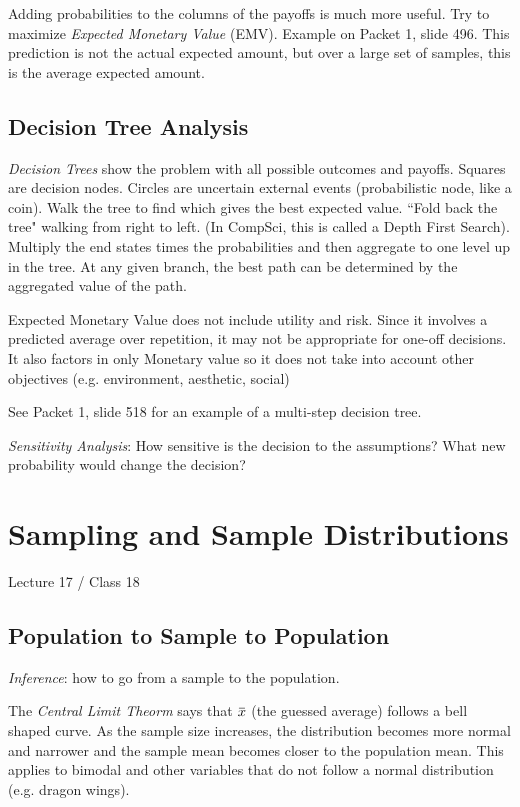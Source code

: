 \documentclass[11pt, oneside]{article}   	%
\newcommand{\overbar}[1]{\mkern 1.5mu\overline{\mkern-1.5mu#1\mkern-1.5mu}\mkern 1.5mu}
\begin{document}
Adding probabilities to the columns of the payoffs is much more useful. Try to maximize \textit{Expected Monetary Value} (EMV). Example on Packet 1, slide 496. This prediction is not the actual expected amount, but over a large set of samples, this is the average expected amount. 

\subsection{Decision Tree Analysis}

\textit{Decision Trees} show the problem with all possible outcomes and payoffs. Squares are decision nodes. Circles are uncertain external events (probabilistic node, like a coin). Walk the tree to find which gives the best expected value. ``Fold back the tree" walking from right to left. (In CompSci, this is called a Depth First Search). Multiply the end states times the probabilities and then aggregate to one level up in the tree. At any given branch, the best path can be determined by the aggregated value of the path.

Expected Monetary Value does not include utility and risk. Since it involves a predicted average over repetition, it may not be appropriate for one-off decisions. It also factors in only Monetary value so it does not take into account other objectives (e.g. environment, aesthetic, social)

See Packet 1, slide 518 for an example of a multi-step decision tree.

\textit{Sensitivity Analysis}: How sensitive is the decision to the assumptions? What new probability would change the decision?


\section{Sampling and Sample Distributions}
Lecture 17 / Class 18

\subsection{Population to Sample to Population}

\textit{Inference}: how to go from a sample to the population.

The \textit{Central Limit Theorm} says that $\overbar{x}$ (the guessed average) follows a bell shaped curve. As the sample size increases, the distribution becomes more normal and narrower and the sample mean becomes closer to the population mean. This applies to bimodal and other variables that do not follow a normal distribution (e.g. dragon wings). 
\end{document}
